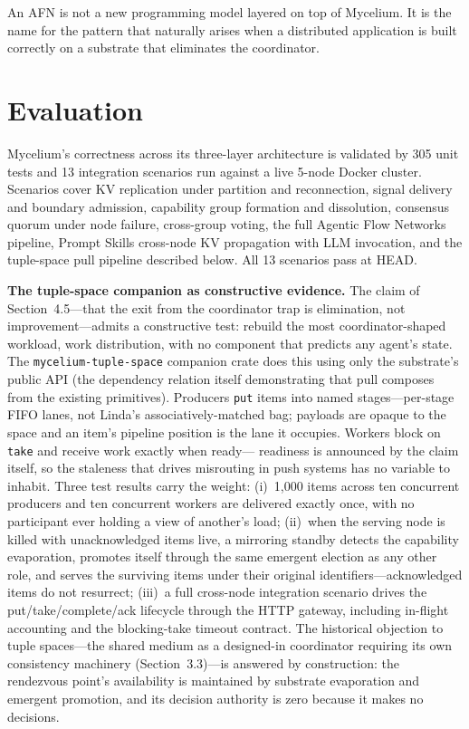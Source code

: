 \documentclass[11pt]{article}
\begin{document}
An AFN is not a new programming model layered on top of Mycelium. It is the name
for the pattern that naturally arises when a distributed application is built
correctly on a substrate that eliminates the coordinator.

\section{Evaluation}

Mycelium's correctness across its three-layer architecture is validated by 305
unit tests and 13 integration scenarios run against a live 5-node Docker cluster.
Scenarios cover KV replication under partition and reconnection, signal delivery
and boundary admission, capability group formation and dissolution, consensus
quorum under node failure, cross-group voting, the full Agentic Flow Networks
pipeline, Prompt Skills cross-node KV propagation with LLM invocation, and the
tuple-space pull pipeline described below. All 13 scenarios pass at HEAD.

\textbf{The tuple-space companion as constructive evidence.} The claim of
Section~4.5---that the exit from the coordinator trap is elimination, not
improvement---admits a constructive test: rebuild the most coordinator-shaped
workload, work distribution, with no component that predicts any agent's state.
The \texttt{mycelium-tuple-space} companion crate does this using only the
substrate's public API (the dependency relation itself demonstrating that pull
composes from the existing primitives). Producers \texttt{put} items into named
stages---per-stage FIFO lanes, not Linda's associatively-matched bag; payloads
are opaque to the space and an item's pipeline position is the lane it
occupies. Workers block on \texttt{take} and receive work exactly when ready---
readiness is announced by the claim itself, so the staleness that drives
misrouting in push systems has no variable to inhabit. Three test results carry
the weight: (i)~1{,}000 items across ten concurrent producers and ten concurrent
workers are delivered exactly once, with no participant ever holding a view of
another's load; (ii)~when the serving node is killed with unacknowledged items
live, a mirroring standby detects the capability evaporation, promotes itself
through the same emergent election as any other role, and serves the surviving
items under their original identifiers---acknowledged items do not resurrect;
(iii)~a full cross-node integration scenario drives the
put/take/complete/ack lifecycle through the HTTP gateway, including in-flight
accounting and the blocking-take timeout contract. The historical objection to
tuple spaces---the shared medium as a designed-in coordinator requiring its own
consistency machinery (Section~3.3)---is answered by construction: the rendezvous
point's availability is maintained by substrate evaporation and emergent
promotion, and its decision authority is zero because it makes no decisions.
\end{document}
